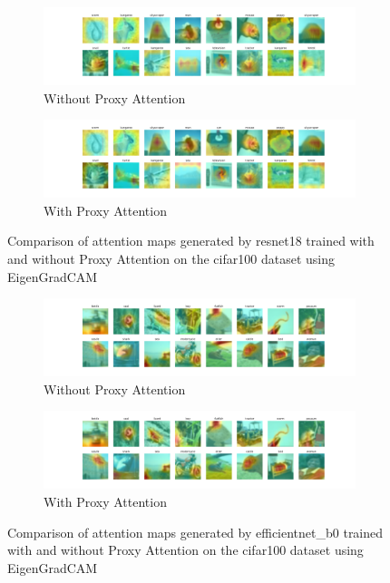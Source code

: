 \documentclass[a4paper,11pt,openright]{book}
\begin{document}
\begin{figure}[!htb]
    \centering
    \begin{subfigure}[b]{1\textwidth}
        \includegraphics[width=\textwidth]{images/cifar100_resnet18_noproxy_3.pdf}
        \caption{Without Proxy Attention}
    \end{subfigure}
    \hfill
    \begin{subfigure}[b]{1\textwidth}
        \includegraphics[width=\textwidth]{images/cifar100_resnet18_proxy_3.pdf}
        \caption{With Proxy Attention}
    \end{subfigure}
    \caption{Comparison of attention maps generated by resnet18 trained with and without Proxy Attention on the cifar100 dataset using EigenGradCAM}
\end{figure}




\begin{figure}[!htb]
    \centering
    \begin{subfigure}[b]{1\textwidth}
        \includegraphics[width=\textwidth]{images/cifar100_efficientnet_b0_noproxy_1.pdf}
        \caption{Without Proxy Attention}
    \end{subfigure}
    \hfill
    \begin{subfigure}[b]{1\textwidth}
        \includegraphics[width=\textwidth]{images/cifar100_efficientnet_b0_proxy_1.pdf}
        \caption{With Proxy Attention}
    \end{subfigure}
    \caption{Comparison of attention maps generated by efficientnet\_b0 trained with and without Proxy Attention on the cifar100 dataset using EigenGradCAM}
\end{figure}
\end{document}
